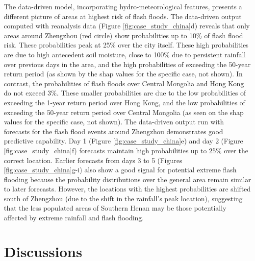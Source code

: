 The  data-driven model, incorporating hydro-meteorological features, presents a different picture of areas at highest risk of flash floods. The data-driven output computed with reanalysis data (Figure \ref{fig:case_study_china}d) reveals that only areas around Zhengzhou (red circle) show probabilities up to 10\% of flash flood risk. These probabilities peak at 25\% over the city itself. These high probabilities are due to high antecedent soil moisture, close to 100\% due to persistent rainfall over previous days in the area, and the high probabilities of exceeding the 50-year return period (as shown by the shap values for the specific case, not shown). In contrast, the probabilities of flash floods over Central Mongolia and Hong Kong do not exceed 3\%. These smaller probabilities are due to the low probabilities of exceeding the 1-year return period over Hong Kong, and the low probabilities of exceeding the 50-year return period over Central Mongolia (as seen on the shap values for the specific case, not shown). The data-driven output run with forecasts for the flash flood events around Zhengzhou demonstrates good predictive capability. Day 1 (Figure \ref{fig:case_study_china}e) and day 2 (Figure \ref{fig:case_study_china}f) forecasts maintain high probabilities up to 25\% over the correct location. Earlier forecasts from days 3 to 5 (Figures \ref{fig:case_study_china}g-i) also show a good signal for potential extreme flash flooding because the probability distributions over the general area remain similar to later forecasts. However, the locations with the highest probabilities are shifted south of Zhengzhou (due to the shift in the rainfall's peak location), suggesting that the less populated areas of Southern Henan may be those potentially affected by extreme rainfall and flash flooding.

\section{Discussions}
\label{regional_to_global_training_discussions}

